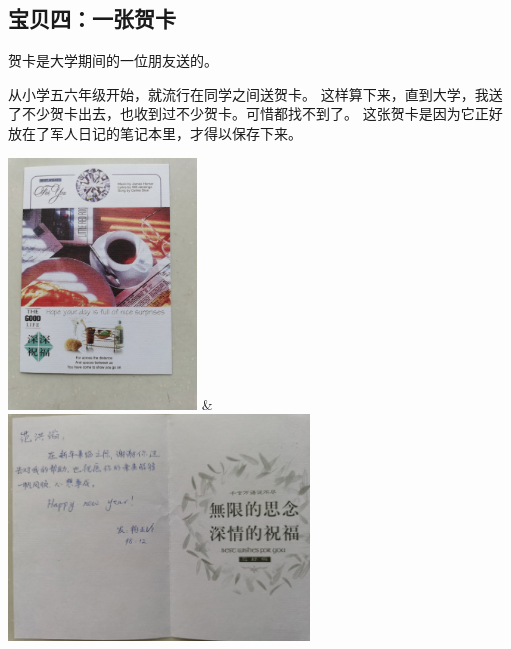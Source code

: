 \endgroup


\subsection{宝贝四：一张贺卡}

贺卡是大学期间的一位朋友送的。

从小学五六年级开始，就流行在同学之间送贺卡。
这样算下来，直到大学，我送了不少贺卡出去，也收到过不少贺卡。可惜都找不到了。
这张贺卡是因为它正好放在了军人日记的笔记本里，才得以保存下来。

\begingroup
  \centering
  \begin{tblr}{}
    \includegraphics[width=5cm]{pic/贺卡-1.jpg}
      & \includegraphics[width=8cm]{pic/贺卡-2.jpg} \\
  \end{tblr}

\endgroup


